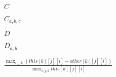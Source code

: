 \documentclass{article}
\begin{document}
$C$
\pagebreak

$C_{a,b,c}$
\pagebreak

$D$
\pagebreak

$D_{a,b}$
\pagebreak

$ \frac{ \max_{i,j,k}(this[k][j][i] - other[k][j][i]) }{
\max_{i,j,k}this[k][j][i] } $
\pagebreak
\end{document}
